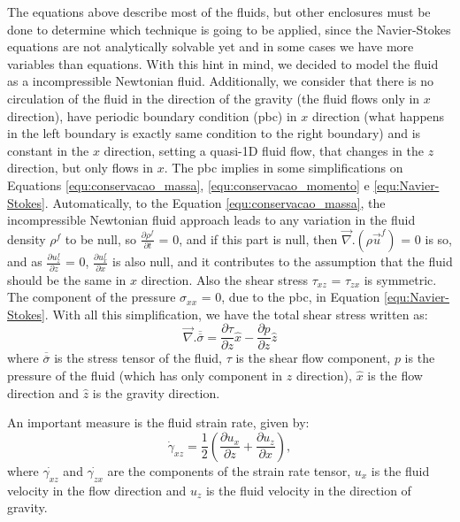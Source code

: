     The equations above describe most of the fluids, but other enclosures must be done to determine which technique is going to be applied, since the Navier-Stokes equations are not analytically solvable yet and in some cases we have more variables than equations. With this hint in mind, we decided to model the fluid as a incompressible Newtonian fluid. Additionally, we consider that there is no circulation of the fluid in the direction of the gravity (the fluid flows only in $x$ direction), have periodic boundary condition (pbc) in $x$ direction (what happens in the left boundary is exactly same condition to the right boundary) and is constant in the $x$ direction, setting a quasi-1D fluid flow, that changes in the $z$ direction, but only flows in $x$. The pbc implies in some simplifications on Equations \ref{equ:conservacao_massa}, \ref{equ:conservacao_momento} e \ref{equ:Navier-Stokes}. Automatically, to the Equation \ref{equ:conservacao_massa}, the incompressible Newtonian fluid approach leads to any variation in the fluid density $\rho^f$ to be null, so $\frac{\partial \rho^f}{\partial t} $ = 0, and if this part is null, then $\vec{\nabla}.(\rho \vec{u}^{f})$ = 0 is so, and as $\frac{\partial u_z^f}{\partial z}$ = 0, $\frac{\partial u_x^f}{\partial x}$ is also null, and it contributes to the assumption that the fluid should be the same in $x$ direction. Also the shear stress $\tau_{xz}$ = $\tau_{zx}$ is symmetric. The component of the pressure $\sigma_{xx}$ = 0, due to the pbc, in Equation \ref{equ:Navier-Stokes}. With all this simplification, we have the total shear stress written as:
\begin{equation}
    \vec{\nabla}.\overline{\overline{\sigma}} = \frac{\partial \tau}{\partial z} \hat{x} - \frac{\partial p}{\partial z} \hat{z}
    \label{equ:divergente_tensor_tensao}
\end{equation}
where $\overline{\overline{\sigma}}$ is the stress tensor of the fluid, $\tau$ is the shear flow component, $p$ is the pressure of the fluid (which has only component in $z$ direction), $\hat{x}$ is the flow direction and $\hat{z}$ is the gravity direction.

    An important measure is the fluid strain rate, given by: 
\begin{equation}
    \dot{\gamma}_{xz} = \frac{1}{2} \left(\frac{\partial u_{x}}{\partial z} +\frac{\partial u_{z}}{\partial x} \right),
    \label{equ:taxa_deformacao}
\end{equation}
where $\dot{\gamma_{xz}}$ and $\dot{\gamma_{zx}}$ are the components of the strain rate tensor, $u_{x}$ is the fluid velocity in the flow direction and $u_{z}$ is the fluid velocity in the direction of gravity.

